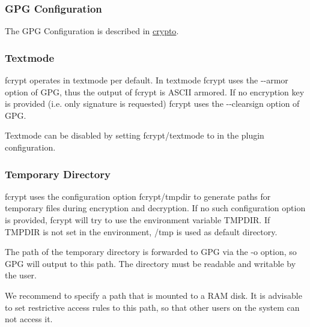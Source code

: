 \begin{DoxyCode}{0}
\end{DoxyCode}
\hypertarget{autotoc_md207_autotoc_md218}{}\subsubsection{G\+P\+G Configuration}\label{autotoc_md207_autotoc_md218}
The G\+PG Configuration is described in \mbox{\hyperlink{autotoc_md113_src_plugins_crypto_README_md}{crypto}}.\hypertarget{autotoc_md207_autotoc_md219}{}\subsubsection{Textmode}\label{autotoc_md207_autotoc_md219}
{\ttfamily fcrypt} operates in textmode per default. In textmode {\ttfamily fcrypt} uses the {\ttfamily -\/-\/armor} option of G\+PG, thus the output of {\ttfamily fcrypt} is A\+S\+C\+II armored. If no encryption key is provided (i.\+e. only signature is requested) {\ttfamily fcrypt} uses the {\ttfamily -\/-\/clearsign} option of G\+PG.

Textmode can be disabled by setting {\ttfamily fcrypt/textmode} to {} in the plugin configuration.\hypertarget{autotoc_md207_autotoc_md220}{}\subsubsection{Temporary Directory}\label{autotoc_md207_autotoc_md220}
{\ttfamily fcrypt} uses the configuration option {\ttfamily fcrypt/tmpdir} to generate paths for temporary files during encryption and decryption. If no such configuration option is provided, {\ttfamily fcrypt} will try to use the environment variable {\ttfamily T\+M\+P\+D\+IR}. If {\ttfamily T\+M\+P\+D\+IR} is not set in the environment, {\ttfamily /tmp} is used as default directory.

The path of the temporary directory is forwarded to G\+PG via the {\ttfamily -\/o} option, so G\+PG will output to this path. The directory must be readable and writable by the user.

We recommend to specify a path that is mounted to a R\+AM disk. It is advisable to set restrictive access rules to this path, so that other users on the system can not access it. 